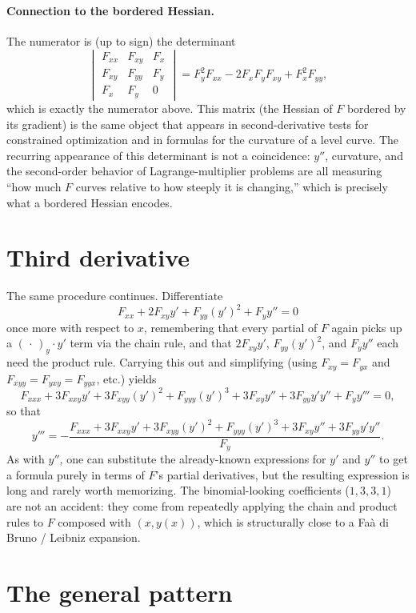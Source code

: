 \documentclass{essay}
\begin{document}
\paragraph{Connection to the bordered Hessian.} The numerator is (up to sign) the
determinant
\[
  \begin{vmatrix}
    F_{xx} & F_{xy} & F_x \\
    F_{xy} & F_{yy} & F_y \\
    F_x    & F_y    & 0
  \end{vmatrix}
  = F_y^2 F_{xx} - 2F_xF_yF_{xy} + F_x^2F_{yy},
\]
which is exactly the numerator above. This matrix (the Hessian of $F$ bordered by its
gradient) is the same object that appears in second-derivative tests for constrained
optimization and in formulas for the curvature of a level curve. The recurring appearance
of this determinant is not a coincidence: $y''$, curvature, and the second-order behavior of
Lagrange-multiplier problems are all measuring ``how much $F$ curves relative to how steeply
it is changing,'' which is precisely what a bordered Hessian encodes.

\section{Third derivative}

The same procedure continues. Differentiate
\[
  F_{xx} + 2F_{xy}y' + F_{yy}(y')^2 + F_y y'' = 0
\]
once more with respect to $x$, remembering that every partial of $F$ again picks up a
$(\,\cdot\,)_y \cdot y'$ term via the chain rule, and that $2F_{xy}y'$, $F_{yy}(y')^2$, and
$F_y y''$ each need the product rule. Carrying this out and simplifying (using $F_{xy} =
F_{yx}$ and $F_{xyy} = F_{yxy} = F_{yyx}$, etc.) yields
\[
  F_{xxx} + 3F_{xxy}y' + 3F_{xyy}(y')^2 + F_{yyy}(y')^3 + 3F_{xy}y'' + 3F_{yy}y'y'' + F_y y''' = 0,
\]
so that
\[
  y''' = -\frac{F_{xxx} + 3F_{xxy}y' + 3F_{xyy}(y')^2 + F_{yyy}(y')^3 + 3F_{xy}y'' +
  3F_{yy}y'y''}{F_y}.
\]
As with $y''$, one can substitute the already-known expressions for $y'$ and $y''$ to get a
formula purely in terms of $F$'s partial derivatives, but the resulting expression is long
and rarely worth memorizing. The binomial-looking coefficients ($1,3,3,1$) are not an
accident: they come from repeatedly applying the chain and product rules to $F$ composed
with $(x, y(x))$, which is structurally close to a Faà di Bruno / Leibniz expansion.

\section{The general pattern}
\end{document}
